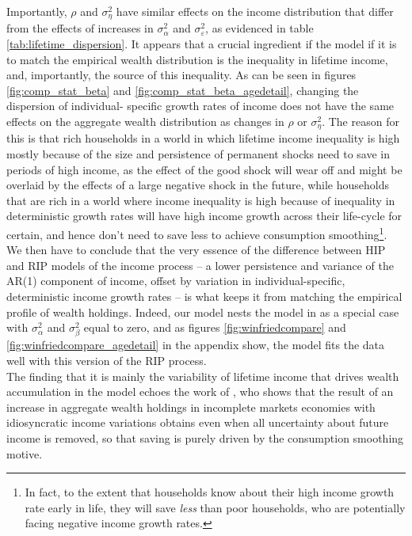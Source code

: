 Importantly, $\rho$ and $\sigma^2_{\eta}$ have similar effects on the income 
distribution that differ from the effects of increases in $\sigma^2_{\alpha}$ and
$\sigma^2_{\varepsilon}$, as evidenced in table \ref{tab:lifetime_dispersion}.
It appears that a crucial ingredient if the model if it is to match the empirical
wealth distribution is the inequality in lifetime income, and, importantly, the
source of this inequality. As can be seen in figures \ref{fig:comp_stat_beta} and
\ref{fig:comp_stat_beta_agedetail}, changing the dispersion of individual-
specific growth rates of income does not have the same effects on the 
aggregate wealth distribution as changes in $\rho$ or $\sigma^2_{\eta}$. The 
reason for this is that rich households in a world in which lifetime income 
inequality is high mostly because of the size and persistence of permanent shocks
need to save in periods of high income, as the effect of the good shock will wear
off and might be overlaid by the effects of a large negative shock in the future,
while households that are rich in a world where income inequality is high because
of inequality in deterministic growth rates will have high income growth across
their life-cycle for certain, and hence don't need to save less to achieve 
consumption smoothing\footnote{In fact, to the extent that households know about
their high income growth rate early in life, they will save \textit{less} than 
poor households, who are potentially facing negative income growth rates.}.
We then have to conclude that the very essence of the difference between HIP and
RIP models of the income process -- a lower persistence and variance of the AR(1)
component of income, offset by variation in individual-specific, deterministic
income growth rates -- is what keeps it from matching the empirical profile of
wealth holdings. Indeed, our model nests the model in \citet{HintermaierKoeniger2011}
as a special case with $\sigma^2_{\alpha}$ and $\sigma^2_{\beta}$ equal to zero,
and as figures \ref{fig:winfriedcompare} and \ref{fig:winfriedcompare_agedetail} in 
the appendix show, the model fits the data well with this version of the RIP 
process. \\
The finding that it is mainly the variability of lifetime income that drives
wealth accumulation in the model echoes the work of \citet{Floden2008}, who 
shows that the \citet{Aiyagari1994} result of an increase in aggregate wealth 
holdings in incomplete markets economies with idiosyncratic income variations
obtains even when all uncertainty about future income is removed, so that 
saving is purely driven by the consumption smoothing motive. 


